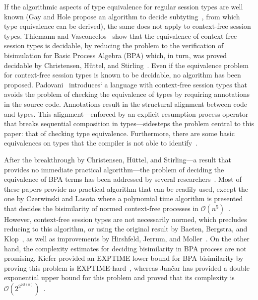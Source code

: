 If the algorithmic aspects of type equivalence for regular session
types are well known (Gay and Hole propose an algorithm to decide
subtyting~\cite{DBLP:journals/acta/GayH05}, from which type
equivalence can be derived), the same does not apply to context-free
session types.
%
Thiemann and Vasconcelos~\cite{thiemann2016context} show that the
equivalence of context-free session types is decidable, by reducing
the problem to the verification of bisimulation for Basic Process
Algebra (BPA) which, in turn, was proved decidable by Christensen,
H{\"{u}}ttel, and Stirling~\cite{DBLP:journals/iandc/ChristensenHS95}.
%
Even if the equivalence problem for context-free session types is
known to be decidable, no algorithm has been proposed.
%
Padovani~\cite{DBLP:conf/esop/Padovani17} introduces` a language with
context-free session types that avoids the problem of checking the
equivalence of types by requiring annotations in the source
code. Annotations result in the structural alignment between code and
types. This alignment---enforced by an explicit resumption process
operator that breaks sequential composition in types---sidesteps the
problem central to this paper: that of checking type equivalence.
Furthermore, there are some basic equivalences on types that the
compiler is not able to identify~\cite{DBLP:conf/esop/Padovani17}.

After the breakthrough by Christensen, H\"uttel, and Stirling---a
result that provides no immediate practical algorithm---the problem of
deciding the equivalence of BPA terms has been addressed by several
researchers~\cite{DBLP:conf/mfcs/BurkartCS95,DBLP:journals/iandc/ChristensenHS95,czerwinski2010fast,janvcar1999techniques}.
Most of these papers provide no practical algorithm that can be
readily used, except the one by Czerwinski and Lasota where a
polynomial time algorithm is presented that decides the bisimilarity
of normed context-free processes in
$\mathcal{O}(n^5)$~\cite{czerwinski2010fast}.
%
However, context-free session types are not necessarily normed, which
precludes reducing to this algorithm, or using the original result by
Baeten, Bergstra, and Klop~\cite{baeten1993decidability}, as well as
improvements by Hirshfeld, Jerrum, and
Moller~\cite{DBLP:journals/tcs/HirshfeldJM96,DBLP:conf/concur/HirshfeldM94}.
On the other hand, the complexity estimates for deciding bisimilarity
in BPA process are not promising. Kiefer provided an EXPTIME lower
bound for BPA bisimilarity by proving this problem is
EXPTIME-hard~\cite{kiefer2013bpa}, whereas Jan\v car has provided a
double exponential upper bound for this problem and proved that its
complexity is
$\mathcal{O}(2^{2^{\mathsf{pol}(n)}})$~\cite{jancar2012bisimilarity}.

